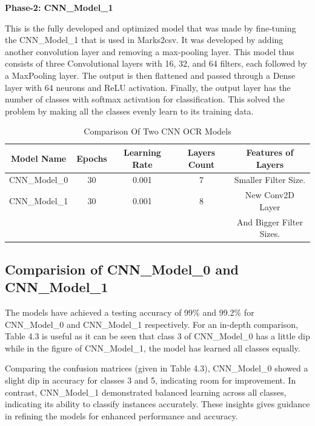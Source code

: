 \noindent \textbf{Phase-2: CNN\_Model\_1} 

\noindent This is the fully developed and optimized model that was made by fine-tuning the CNN\_Model\_1 that is used in Marks2csv. It was developed by adding another convolution layer and removing a max-pooling layer. This model thus consists of three Convolutional layers with 16, 32, and 64 filters, each followed by a MaxPooling layer. The output is then flattened and passed through a Dense layer with 64 neurons and ReLU activation. Finally, the output layer has the number of classes with softmax activation for classification. This solved the problem by making all the classes evenly learn to its training data.

\vspace{3mm}

\begin{table}[h]
    \centering
    \begin{tabular}{|c|c|c|c|c|}
    \hline
    Model Name & Epochs & Learning Rate & Layers Count & Features of Layers \\
    \hline
    CNN\_Model\_0 & 30 & 0.001 & 7 & Smaller Filter Size.\\
    \hline
    CNN\_Model\_1 & 30 & 0.001 & 8 & New Conv2D Layer\\
     & & & & And Bigger Filter Sizes.\\
    \hline
    \end{tabular}
    \caption{Comparison Of Two CNN OCR Models}
\end{table}  

\clearpage

\subsection{Comparision of CNN\_Model\_0 and CNN\_Model\_1}

\noindent The models have achieved a testing accuracy of 99\% and 99.2\% for CNN\_Model\_0 and CNN\_Model\_1 respectively. For an in-depth comparison, Table 4.3 is useful as it can be seen that class 3 of CNN\_Model\_0 has a little dip while in the figure of CNN\_Model\_1, the model has learned all classes equally.

\noindent Comparing the confusion matrices (given in Table 4.3), CNN\_Model\_0 showed a slight dip in accuracy for classes 3 and 5, indicating room for improvement. In contrast, CNN\_Model\_1 demonstrated balanced learning across all classes, indicating its ability to classify instances accurately. These insights gives guidance in refining the models for enhanced performance and accuracy.

